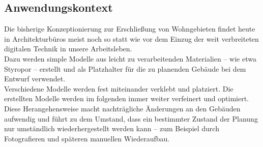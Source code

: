 \subsection{Anwendungskontext}\label{sec:Anwendungskontext} 
Die bisherige Konzeptionierung zur Erschließung von Wohngebieten findet heute in Architekturbüros meist noch so statt wie vor dem Einzug der weit verbreiteten digitalen Technik in unsere Arbeitsleben.\\
Dazu werden simple Modelle aus leicht zu verarbeitenden Materialien -- wie etwa Styropor -- erstellt und als Platzhalter für die zu planenden Gebäude bei dem Entwurf verwendet.\\
Verschiedene Modelle werden fest miteinander verklebt und platziert. Die erstellten Modelle werden im folgenden immer weiter verfeinert und optimiert. 
Diese Herangehensweise macht nachträgliche Änderungen an den Gebäuden aufwendig und führt zu dem Umstand, dass ein bestimmter Zustand der Planung nur umständlich wiederhergestellt werden kann -- zum Beispiel durch Fotografieren und späteren manuellen Wiederaufbau.\\



